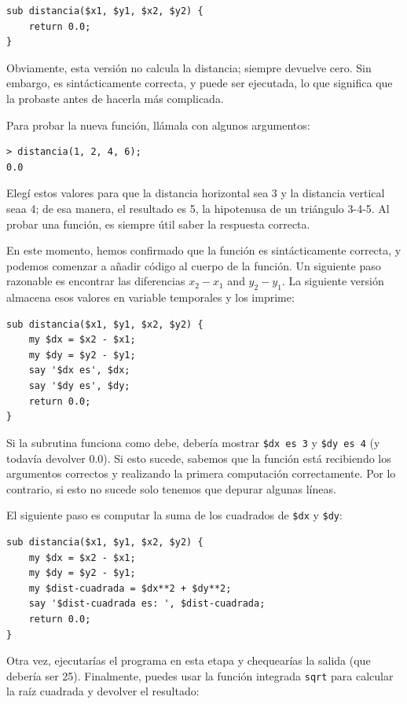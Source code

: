 \begin{lstlisting}
sub distancia($x1, $y1, $x2, $y2) {
    return 0.0;
}
\end{lstlisting}
%
Obviamente, esta versión no calcula la distancia; siempre 
devuelve cero. Sin embargo, es sintácticamente correcta, y 
puede ser ejecutada, lo que significa que la probaste antes 
de hacerla más complicada.

Para probar la nueva función, llámala con algunos argumentos:

\begin{lstlisting}
> distancia(1, 2, 4, 6);
0.0
\end{lstlisting}
%
Elegí estos valores para que la distancia horizontal sea 3 y la distancia
vertical seaa 4; de esa manera, el resultado es 5, la hipotenusa de 
un triángulo 3-4-5. Al probar una función, es siempre útil saber la 
respuesta correcta.

En este momento, hemos confirmado que la función es sintácticamente 
correcta, y podemos comenzar a añadir código al cuerpo de
la función. Un siguiente paso razonable es encontrar las diferencias
$x_2 - x_1$ and $y_2 - y_1$.  La siguiente versión almacena esos valores
en variable temporales y los imprime:

\begin{lstlisting}
sub distancia($x1, $y1, $x2, $y2) {
    my $dx = $x2 - $x1;
    my $dy = $y2 - $y1;
    say '$dx es', $dx;
    say '$dy es', $dy;
    return 0.0;
}
\end{lstlisting}
%
Si la subrutina funciona como debe, debería mostrar \verb"$dx es 3" y 
\verb"$dy es 4" (y todavía devolver 0.0). Si esto sucede, sabemos
que la función está recibiendo los argumentos correctos y realizando
la primera computación correctamente. Por lo contrario, si esto no sucede
solo tenemos que depurar algunas líneas.

El siguiente paso es computar la suma de los cuadrados de {\tt \$dx} y 
{\tt \$dy}:

\begin{lstlisting}
sub distancia($x1, $y1, $x2, $y2) {
    my $dx = $x2 - $x1;
    my $dy = $y2 - $y1;
    my $dist-cuadrada = $dx**2 + $dy**2;
    say '$dist-cuadrada es: ', $dist-cuadrada;
    return 0.0;
}
\end{lstlisting}
%
Otra vez, ejecutarías el programa en esta etapa y 
chequearías la salida (que debería ser 25).
Finalmente, puedes usar la función integrada {\tt sqrt} 
para calcular la raíz cuadrada y devolver el resultado:

